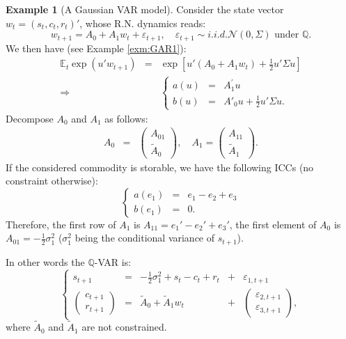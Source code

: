 \documentclass[
  12pt,
]{book}
\theoremstyle{definition}
\theoremstyle{definition}
\newtheorem{example}{Example}[chapter]
\theoremstyle{definition}
\theoremstyle{definition}
\theoremstyle{remark}
\begin{document}
\begin{example}[A Gaussian VAR model]
\protect\hypertarget{exm:FCFPGaussian}{}\label{exm:FCFPGaussian}Consider the state vector \(w_t = (s_t, c_t, r_t)'\), whose R.N. dynamics reads:
\[
w_{t+1} = A_0 + A_1 w_t + \varepsilon_{t+1}, \quad \varepsilon_{t+1} \sim  i.i.d. \mathcal{N}(0,\Sigma) \mbox{ under }\mathbb{Q}.
\]
We then have (see Example \ref{exm:GAR1}):
\begin{eqnarray*}
\mathbb{E}_t \exp (u' w_{t+1}) &=& \exp \left[u' (A_0 + A_1 w_t) + \frac{1}{2} u' \Sigma u\right] \\
\Rightarrow &&
\left\{
\begin{array}{ccl}
a(u) &=&A^{'}_1 u \\
b(u) & =& A'_0 u + \frac{1}{2} u' \Sigma u. \end{array} \right.
\end{eqnarray*}
Decompose \(A_0\) and \(A_1\) as follows:
\begin{eqnarray*}
A_0 &=& \left(
\begin{array}{c} A_{01} \\ \tilde{A}_0
\end{array}
\right), \quad A_1 = \left(
\begin{array}{c} A_{11} \\
\tilde{A}_1
\end{array}
\right).
\end{eqnarray*}
If the considered commodity is storable, we have the following ICCs (no constraint otherwise):
\[
\left\{
\begin{array}{ccl}
a (e_1) & = & e_1 - e_2 + e_3 \\
b (e_1) &=& 0. \end{array}
\right.
\]
Therefore, the first row of \(A_1\) is \(A_{11} = e_1'- e_2' + e_3'\), the first element of \(A_0\) is \(A_{01} = -\frac{1}{2}\sigma^2_1\) (\(\sigma^2_1\) being the conditional variance of \(s_{t+1}\)).

In other words the \(\mathbb{Q}\)-VAR is:
\[
\left\{\begin{array}{cclcc} s_{t+1} & = & -\frac{1}{2}
\sigma^2_1 + s_t - c_t + r_t &+& \varepsilon_{1,t+1} \\
\left(\begin{array}{c} c_{t+1} \\ r_{t+1} \end{array} \right) & = &
\tilde{A}_0 + \tilde{A}_1 w_t &+& \left(\begin{array}{c} \varepsilon_{2,t+1} \\
\varepsilon_{3,t+1} \end{array} \right),
\end{array} \right.
\]
where \(\tilde{A}_0\) and \(\tilde{A}_1\) are not constrained.


\end{example}
\end{document}
